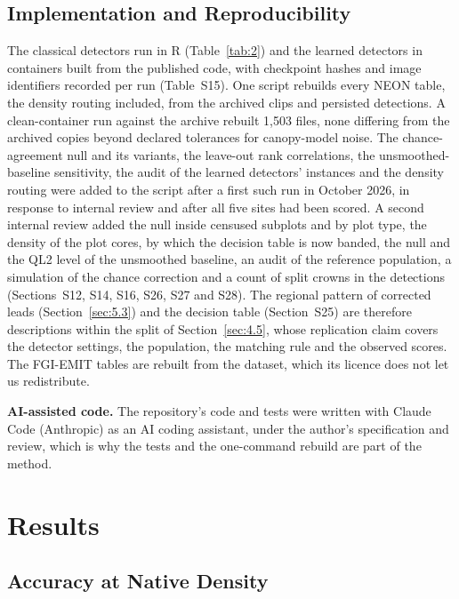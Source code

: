 \documentclass[journal]{IEEEtran}
\begin{document}
\subsection{Implementation and Reproducibility}\label{sec:4.7}

The classical detectors run in R (Table~\ref{tab:2}) and the learned detectors in
containers built from the published code, with checkpoint hashes and image
identifiers recorded per run (Table~S15). One script rebuilds every NEON table,
the density routing included, from the archived clips and persisted detections.
A clean-container run against the archive rebuilt 1,503 files, none differing
from the archived copies beyond declared tolerances for canopy-model noise. The
chance-agreement null and its variants, the leave-out rank correlations, the
unsmoothed-baseline sensitivity, the audit of the learned detectors' instances
and the density routing were added to the script after a first such run in
October 2026, in response to internal review and after all five sites had been
scored. A second internal review added the null inside censused subplots and by
plot type, the density of the plot cores, by which the decision table is now
banded, the null and the QL2 level of the unsmoothed baseline, an audit of the
reference population, a simulation of the chance correction and a count of split
crowns in the detections (Sections~S12, S14, S16, S26, S27 and S28). The
regional pattern of corrected leads (Section~\ref{sec:5.3}) and the decision table
(Section~S25) are therefore descriptions within the split of Section~\ref{sec:4.5}, whose
replication claim covers the detector settings, the population, the matching
rule and the observed scores. The FGI-EMIT tables are rebuilt from the dataset,
which its licence does not let us redistribute.

\textbf{AI-assisted code.} The repository's code and tests were written with Claude
Code (Anthropic) as an AI coding assistant, under the author's specification and
review, which is why the tests and the one-command rebuild are part of the
method.

\section{Results}\label{sec:5}

\subsection{Accuracy at Native Density}\label{sec:5.1}
\end{document}
